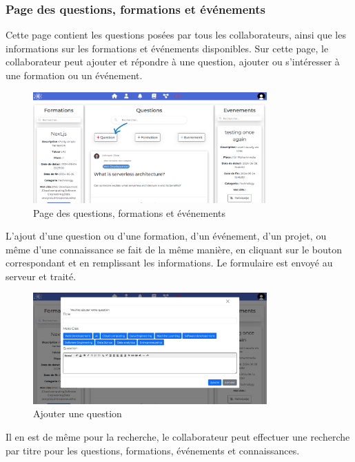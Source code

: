 \documentclass{article}
\begin{document}
            \subsubsection{Page des questions, formations et événements}
                Cette page contient les questions posées par tous les collaborateurs, ainsi que les informations sur les formations et événements disponibles. Sur cette page, le collaborateur peut ajouter et répondre à une question, ajouter ou s'intéresser à une formation ou un événement.
                \begin{figure}[h!]
                    \centering
                    \includegraphics[width=0.8\textwidth]{assets/webSite/Acceuil.png}
                    \caption{Page des questions, formations et événements}
                \end{figure}
                \FloatBarrier
                L'ajout d'une question ou d'une formation, d'un événement, d'un projet, ou même d'une connaissance se fait de la même manière, en cliquant sur le bouton correspondant et en remplissant les informations. Le formulaire est envoyé au serveur et traité.
                \begin{figure}[h!]
                    \centering
                    \includegraphics[width=0.8\textwidth]{assets/webSite/addQuestion.png}
                    \caption{Ajouter une question}
                \end{figure}
                \FloatBarrier
                Il en est de même pour la recherche, le collaborateur peut effectuer une recherche par titre pour les questions, formations, événements et connaissances.
\end{document}
